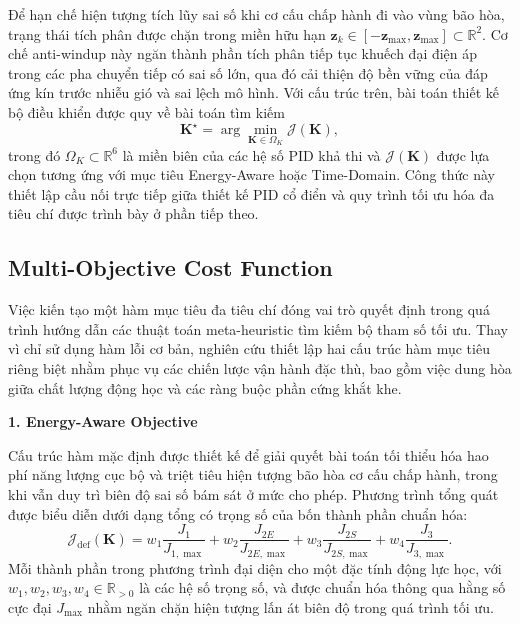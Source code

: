 \documentclass[conference, a4paper]{IEEEtran}
\begin{document}
Để hạn chế hiện tượng tích lũy sai số khi cơ cấu chấp hành đi vào vùng bão hòa, trạng thái tích phân được chặn trong miền hữu hạn $\mathbf{z}_{k} \in [-\mathbf{z}_{\max},\mathbf{z}_{\max}] \subset \mathbb{R}^{2}$. Cơ chế anti-windup này ngăn thành phần tích phân tiếp tục khuếch đại điện áp trong các pha chuyển tiếp có sai số lớn, qua đó cải thiện độ bền vững của đáp ứng kín trước nhiễu gió và sai lệch mô hình. Với cấu trúc trên, bài toán thiết kế bộ điều khiển được quy về bài toán tìm kiếm
\begin{equation}
\boldsymbol{K}^{\star} = \arg\min_{\boldsymbol{K} \in \Omega_{K}} \mathcal{J}(\boldsymbol{K}),
\end{equation}
trong đó $\Omega_{K} \subset \mathbb{R}^{6}$ là miền biên của các hệ số PID khả thi và $\mathcal{J}(\boldsymbol{K})$ được lựa chọn tương ứng với mục tiêu Energy-Aware hoặc Time-Domain. Công thức này thiết lập cầu nối trực tiếp giữa thiết kế PID cổ điển và quy trình tối ưu hóa đa tiêu chí được trình bày ở phần tiếp theo.

\subsection{Multi-Objective Cost Function}
Việc kiến tạo một hàm mục tiêu đa tiêu chí đóng vai trò quyết định trong quá trình hướng dẫn các thuật toán meta-heuristic tìm kiếm bộ tham số tối ưu. Thay vì chỉ sử dụng hàm lỗi cơ bản, nghiên cứu thiết lập hai cấu trúc hàm mục tiêu riêng biệt nhằm phục vụ các chiến lược vận hành đặc thù, bao gồm việc dung hòa giữa chất lượng động học và các ràng buộc phần cứng khắt khe.

\textbf{1. Energy-Aware Objective}

Cấu trúc hàm mặc định được thiết kế để giải quyết bài toán tối thiểu hóa hao phí năng lượng cục bộ và triệt tiêu hiện tượng bão hòa cơ cấu chấp hành, trong khi vẫn duy trì biên độ sai số bám sát ở mức cho phép. Phương trình tổng quát được biểu diễn dưới dạng tổng có trọng số của bốn thành phần chuẩn hóa:
\begin{equation}
\mathcal{J}_{\text{def}}(\boldsymbol{K}) = w_{1} \frac{J_1}{J_{1,\max}} + w_{2} \frac{J_{2E}}{J_{2E,\max}} + w_{3} \frac{J_{2S}}{J_{2S,\max}} + w_{4} \frac{J_3}{J_{3,\max}}.
\end{equation}
Mỗi thành phần trong phương trình đại diện cho một đặc tính động lực học, với $w_1, w_2, w_3, w_4 \in \mathbb{R}_{>0}$ là các hệ số trọng số, và được chuẩn hóa thông qua hằng số cực đại $J_{\max}$ nhằm ngăn chặn hiện tượng lấn át biên độ trong quá trình tối ưu. 
\end{document}
